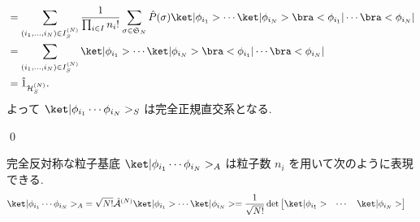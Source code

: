 \documentclass[uplatex,dvipdfmx,a4paper,11pt]{jlreq}
\makeatletter
\DeclareMathOperator{\Det}{det}
\newcommand{\HH}{\mathcal{H}}
\renewcommand{\SS}{\mathfrak{S}}
\newcommand{\A}{\mathcal{A}}
\numberwithin{equation}{section}
\theoremstyle{definition}
\renewenvironment{proof}[1][\proofname]{\par
  \normalfont
  \topsep6\p@\@plus6\p@ \trivlist
  \item[\hskip\labelsep{\bfseries #1}\@addpunct{\bfseries}]\ignorespaces\quad\par
}{
  \qed\endtrivlist\@endpefalse
}
\renewcommand\proofname{証明}
\makeatother
\begin{document}
\begin{proof}
\begin{align}
     & = \sum_{(i_1,\ldots,i_N)\in I_S^{(N)}}\frac{1}{\prod_{i\in I}n_i!}\sum_{\sigma\in\SS_N}\hat{P}(\sigma)\ket|\phi_{i_1}>\cdots\ket|\phi_{i_N}>\bra<\phi_{i_1}|\cdots\bra<\phi_{i_N}|                                           \\
     & = \sum_{(i_1,\ldots,i_N)\in I_S^{(N)}}\ket|\phi_{i_1}>\cdots\ket|\phi_{i_N}>\bra<\phi_{i_1}|\cdots\bra<\phi_{i_N}|                                                                                                           \\
     & = \hat{1}_{\HH_S^{(N)}}.
  \end{align}
  よって $\ket|\phi_{i_1}\cdots\phi_{i_N}>_S$ は完全正規直交系となる.
\end{proof}

\begin{theorem}[Q21-19(ii), Q21-21(i)(ii)]
  完全反対称な粒子基底 $\ket|\phi_{i_1}\cdots\phi_{i_N}>_A$ は粒子数 $n_i$ を用いて次のように表現できる.
  \begin{align}
    \ket|\phi_{i_1}\cdots\phi_{i_N}>_A & = \sqrt{N!}\hat{\A}^{(N)}\ket|\phi_{i_1}>\cdots\ket|\phi_{i_N}> = \frac{1}{\sqrt{N!}}\Det\begin{bmatrix}\ket|\phi_{i_1}> & \cdots & \ket|\phi_{i_N}>\end{bmatrix}
  \end{align}
\end{theorem}
\end{document}
